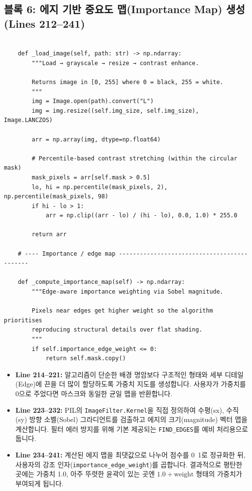 \subsection*{블록 6: 에지 기반 중요도 맵(Importance Map) 생성 (Lines 212--241)}
\begin{lstlisting}[firstnumber=212]

    def _load_image(self, path: str) -> np.ndarray:
        """Load → grayscale → resize → contrast enhance.

        Returns image in [0, 255] where 0 = black, 255 = white.
        """
        img = Image.open(path).convert("L")
        img = img.resize((self.img_size, self.img_size), Image.LANCZOS)

        arr = np.array(img, dtype=np.float64)

        # Percentile-based contrast stretching (within the circular mask)
        mask_pixels = arr[self.mask > 0.5]
        lo, hi = np.percentile(mask_pixels, 2), np.percentile(mask_pixels, 98)
        if hi - lo > 1:
            arr = np.clip((arr - lo) / (hi - lo), 0.0, 1.0) * 255.0

        return arr

    # ---- Importance / edge map --------------------------------------------

    def _compute_importance_map(self) -> np.ndarray:
        """Edge-aware importance weighting via Sobel magnitude.

        Pixels near edges get higher weight so the algorithm prioritises
        reproducing structural details over flat shading.
        """
        if self.importance_edge_weight <= 0:
            return self.mask.copy()

\end{lstlisting}
\begin{itemize}
\item \textbf{Line 214--221:} 알고리즘이 단순한 배경 명암보다 구조적인 형태와 세부 디테일(Edge)에 끈을 더 많이 할당하도록 가중치 지도를 생성합니다. 사용자가 가중치를 0으로 주었다면 마스크와 동일한 균일 맵을 반환합니다.
\item \textbf{Line 223--232:} PIL의 \texttt{ImageFilter.Kernel}을 직접 정의하여 수평(sx), 수직(sy) 방향 소벨(Sobel) 그라디언트를 검출하고 에지의 크기(magnitude) 벡터 맵을 계산합니다. 필터 에러 방지를 위해 기본 제공되는 \texttt{FIND\_EDGES}를 예비 처리용으로 둡니다.
\item \textbf{Line 234--241:} 계산된 에지 맵을 최댓값으로 나누어 점수를 0\string~1로 정규화한 뒤, 사용자의 강조 인자(\texttt{importance\_edge\_weight})를 곱합니다. 결과적으로 평탄한 곳에는 가중치 1.0, 아주 뚜렷한 윤곽이 있는 곳엔 \(1.0 + \text{weight}\) 형태의 가중치가 부여되게 됩니다.
\end{itemize}

